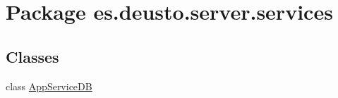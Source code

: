 \hypertarget{namespacees_1_1deusto_1_1server_1_1services}{}\section{Package es.\+deusto.\+server.\+services}
\label{namespacees_1_1deusto_1_1server_1_1services}
\subsection*{Classes}
\begin{DoxyCompactItemize}
\item 
class \mbox{\hyperlink{classes_1_1deusto_1_1server_1_1services_1_1_app_service_d_b}{App\+Service\+DB}}
\end{DoxyCompactItemize}
